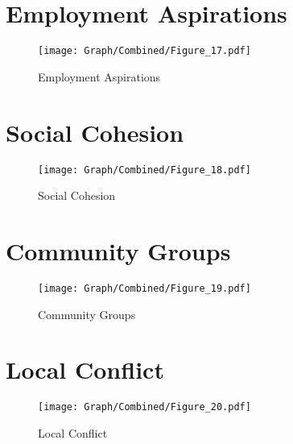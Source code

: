 \documentclass[10pt,a4paper]{article}
\begin{document}
\section{Employment Aspirations}
\begin{table}[H]\centering

\end{table}
\begin{figure}[H]\centering
\texttt{[image: Graph/Combined/Figure\_17.pdf]}
\caption{Employment Aspirations} \label{fig:Fig_17}
\end{figure}
\begin{table}[H]\centering

\end{table}
\section{Social Cohesion}
\begin{table}[H]\centering

\end{table}
\begin{figure}[H]\centering
\texttt{[image: Graph/Combined/Figure\_18.pdf]}
\caption{Social Cohesion} \label{fig:Fig_18}
\end{figure}
\begin{table}[H]\centering

\end{table}
\section{Community Groups}
\begin{table}[H]\centering

\end{table}
\begin{figure}[H]\centering
\texttt{[image: Graph/Combined/Figure\_19.pdf]}
\caption{Community Groups} \label{fig:Fig_19}
\end{figure}
\begin{table}[H]\centering

\end{table}
\section{Local Conflict}
\begin{table}[H]\centering

\end{table}
\begin{figure}[H]\centering
\texttt{[image: Graph/Combined/Figure\_20.pdf]}
\caption{Local Conflict} \label{fig:Fig_20}
\end{figure}
\begin{table}[H]\centering

\end{table}
\end{document}
